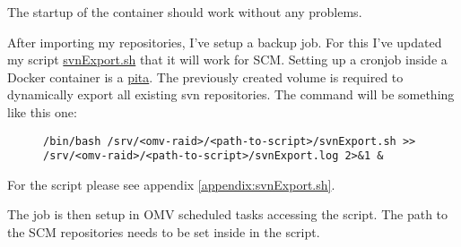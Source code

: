 The startup of the container should work without any problems.


After importing my repositories, I've setup a backup job. For this I've updated
my script \href{https://github.com/ThirtySomething/NAS}{svnExport.sh} that it
will work for \gls{SCM}. Setting up a cronjob inside a \gls{Docker} container
is a \href{https://en.wiktionary.org/wiki/pain_in_the_ass}{pita}. The previously
created volume is required to dynamically export all existing \gls{svn}
repositories. The command will be something like this one:

\begin{figure}[H]
    \scriptsize
    \centering
    \begin{BVerbatim}
/bin/bash /srv/<omv-raid>/<path-to-script>/svnExport.sh >>
/srv/<omv-raid>/<path-to-script>/svnExport.log 2>&1 &
    \end{BVerbatim}
\end{figure}

For the script please see appendix \ref{appendix:svnExport.sh}.
\bigbreak

The job is then setup in \gls{OMV} scheduled tasks accessing the script.
 The path to the \gls{SCM} repositories needs to be set
inside in the script.

